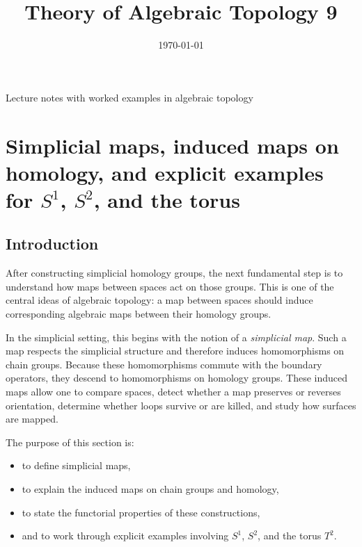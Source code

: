 \documentclass[12pt,a4paper]{article}
\title{\vspace{-1.5em}\bfseries Theory of Algebraic Topology 9}
\author{}
\date{\today}
\theoremstyle{notespace}
\begin{document}
	\maketitle
	\thispagestyle{plain}
		\begin{center}
		\begin{minipage}{0.92\textwidth}
			Lecture notes with worked examples in algebraic topology
		\end{minipage}
	\end{center}
		\tableofcontents
	\clearpage

\section{Simplicial maps, induced maps on homology, and explicit examples for \texorpdfstring{$S^1$}{S1}, \texorpdfstring{$S^2$}{S2}, and the torus}

\subsection{Introduction}

After constructing simplicial homology groups, the next fundamental step is to understand how maps between spaces act on those groups. This is one of the central ideas of algebraic topology: a map between spaces should induce corresponding algebraic maps between their homology groups.

In the simplicial setting, this begins with the notion of a \emph{simplicial map}. Such a map respects the simplicial structure and therefore induces homomorphisms on chain groups. Because these homomorphisms commute with the boundary operators, they descend to homomorphisms on homology groups. These induced maps allow one to compare spaces, detect whether a map preserves or reverses orientation, determine whether loops survive or are killed, and study how surfaces are mapped.

The purpose of this section is:
\begin{itemize}
	\item to define simplicial maps,
	\item to explain the induced maps on chain groups and homology,
	\item to state the functorial properties of these constructions,
	\item and to work through explicit examples involving \(S^1\), \(S^2\), and the torus \(T^2\).
\end{itemize}
\end{document}
